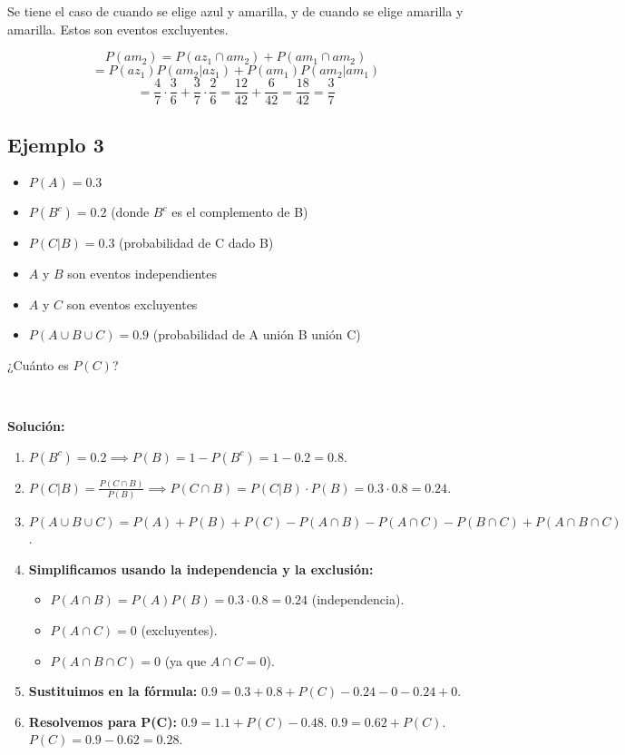 \documentclass[letterpaper, 12pt]{article}
\begin{document}
	Se tiene el caso de cuando se elige azul y amarilla, y de cuando se elige amarilla y amarilla. Estos son eventos excluyentes.
	
	$$P(am_2) = P(az_1 \cap am_2) + P(am_1 \cap am_2)$$
	$$= P(az_1)P(am_2 | az_1) + P(am_1)P(am_2 | am_1)$$
	$$= \frac{4}{7} \cdot \frac{3}{6} + \frac{3}{7} \cdot \frac{2}{6} = \frac{12}{42} + \frac{6}{42} = \frac{18}{42} = \boxed{\frac{3}{7}}$$
	
	\subsection{Ejemplo 3}
	\begin{itemize}
		\item $P(A) = 0.3$
		\item $P(B^c) = 0.2$ (donde $B^c$ es el complemento de B)
		\item $P(C | B) = 0.3$ (probabilidad de C dado B)
		\item $A$ y $B$ son eventos independientes
		\item $A$ y $C$ son eventos excluyentes
		\item $P(A \cup B \cup C) = 0.9$ (probabilidad de A unión B unión C)
	\end{itemize}
	
	¿Cuánto es $P(C)$?
	
	\,
	
	\textbf{Solución:}
	\begin{enumerate}
		\item $P(B^c) = 0.2 \implies P(B) = 1 - P(B^c) = 1 - 0.2 = 0.8$.
		
		\item $P(C | B) = \frac{P(C \cap B)}{P(B)} \implies P(C \cap B) = P(C | B) \cdot P(B) = 0.3 \cdot 0.8 = 0.24$.
		
		\item $P(A \cup B \cup C) = P(A) + P(B) + P(C) - P(A \cap B) - P(A \cap C) - P(B \cap C) + P(A \cap B \cap C)$.
		
		\item \textbf{Simplificamos usando la independencia y la exclusión:}
		\begin{itemize}
			\item $P(A \cap B) = P(A)P(B) = 0.3 \cdot 0.8 = 0.24$ (independencia).
			\item $P(A \cap C) = 0$ (excluyentes).
			\item $P(A \cap B \cap C) = 0$ (ya que $A \cap C = 0$).
		\end{itemize}
		
		\item \textbf{Sustituimos en la fórmula:}
		$0.9 = 0.3 + 0.8 + P(C) - 0.24 - 0 - 0.24 + 0$.
		
		\item \textbf{Resolvemos para P(C):}
		$0.9 = 1.1 + P(C) - 0.48$.
		$0.9 = 0.62 + P(C)$.
		$P(C) = 0.9 - 0.62 = 0.28$.
	\end{enumerate}
	
\end{document}
